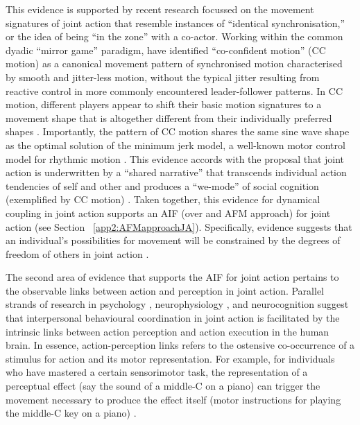 \begin{CJK}{UTF8}{gbsn}
This evidence is supported by recent research focussed on the movement signatures of joint action that resemble instances of ``identical synchronisation,'' or the idea of being ``in the zone'' with a co-actor. Working within the common dyadic ``mirror game'' paradigm, \textcite{Noy2011,Noy2015,Hart2014} have identified ``co-confident motion'' (CC motion) as a canonical movement pattern of synchronised motion characterised by smooth and jitter-less motion, without the typical jitter resulting from reactive control in more commonly encountered leader-follower patterns.  In CC motion, different players appear to shift their basic motion signatures to a movement shape that is altogether different from their individually preferred shapes \citep{Hart2014}. Importantly, the pattern of CC motion shares the same sine wave shape as the optimal solution of the minimum jerk model, a well-known motor control model for rhythmic motion \citep{Hogan2007}.  This evidence accords with the proposal that joint action is underwritten by a ``shared narrative'' that transcends individual action tendencies of self and other and produces a  ``we-mode'' of social cognition (exemplified by CC motion) \citep{Gallotti2013}.  Taken together, this evidence for dynamical coupling in joint action supports an AIF (over and AFM approach) for joint action (see Section ~\ref{app2:AFMapproachJA}).  Specifically, evidence suggests that an individual's possibilities for movement will be constrained by the degrees of freedom of others in joint action \citep{Richardson2015}.



The second area of evidence that supports the AIF for joint action pertains to the observable links between action and perception in joint action.  Parallel strands of research in psychology \citep{Prinz1990,Prinz1997,Prinz2013}, neurophysiology \citep{Rizzolatti2004,Rizzolatti2010}, and neurocognition \citep{Wolpert1998,Wolpert2000} suggest that interpersonal behavioural coordination in joint action is facilitated by the intrinsic links between action perception and action execution in the human brain.  In essence, action-perception links refers to the ostensive co-occurrence of a stimulus for action and its motor representation.  For example, for individuals who have mastered a certain sensorimotor task, the representation of a perceptual effect (say the sound of a middle-C on a piano) can trigger the movement necessary to produce the effect itself (motor instructions for playing the middle-C key on a piano) \citep{Novembre2014}.


\end{CJK}
